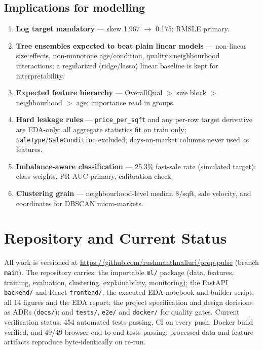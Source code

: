 \documentclass[11pt,a4paper]{article}
\begin{document}
\subsection{Implications for modelling}
\begin{enumerate}
  \item \textbf{Log target mandatory} --- skew 1.967 $\to$ 0.175; RMSLE primary.
  \item \textbf{Tree ensembles expected to beat plain linear models} ---
        non-linear size effects, non-monotone age/condition,
        quality$\times$neighbourhood interactions; a regularized (ridge/lasso)
        linear baseline is kept for interpretability.
  \item \textbf{Expected feature hierarchy} --- OverallQual $>$ size block $>$
        neighbourhood $>$ age; importance read in groups.
  \item \textbf{Hard leakage rules} --- \texttt{price\_per\_sqft} and any
        per-row target derivative are EDA-only; all aggregate statistics fit on
        train only; \texttt{SaleType}/\texttt{SaleCondition} excluded;
        days-on-market columns never used as features.
  \item \textbf{Imbalance-aware classification} --- 25.3\% fast-sale rate
        (simulated target): class weights, PR-AUC primary, calibration check.
  \item \textbf{Clustering grain} --- neighbourhood-level median \$/sqft, sale
        velocity, and coordinates for DBSCAN micro-markets.
\end{enumerate}

\section{Repository and Current Status}
All work is versioned at
\url{https://github.com/rushmanthnalluri/prop-pulse} (branch \texttt{main}).
The repository carries: the importable \texttt{ml/} package (data, features,
training, evaluation, clustering, explainability, monitoring); the FastAPI
\texttt{backend/} and React \texttt{frontend/}; the executed EDA notebook and
builder script; all 14 figures and the EDA report; the project specification
and design decisions as ADRs (\texttt{docs/}); and \texttt{tests/},
\texttt{e2e/} and \texttt{docker/} for quality gates. Current verification
status: 454 automated tests passing, CI on every push, Docker build verified,
and 49/49 browser end-to-end tests passing; processed data and feature
artifacts reproduce byte-identically on re-run.
\end{document}
